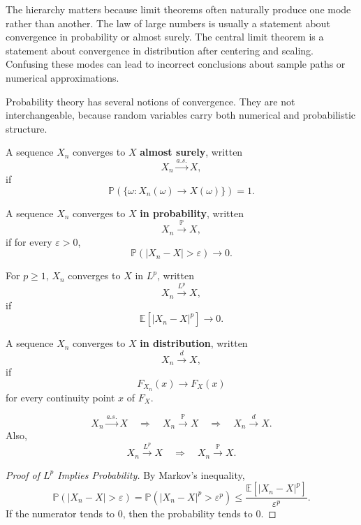 The hierarchy matters because limit theorems often naturally produce one mode rather than another. The law of large numbers is usually a statement about convergence in probability or almost surely. The central limit theorem is a statement about convergence in distribution after centering and scaling. Confusing these modes can lead to incorrect conclusions about sample paths or numerical approximations.

Probability theory has several notions of convergence. They are not interchangeable, because random variables carry both numerical and probabilistic structure.

\begin{definition}
A sequence $X_n$ converges to $X$ \textbf{almost surely}, written
\[
    X_n\xrightarrow{a.s.}X,
\]
if
\[
    \mathbb{P}\left(\{\omega:X_n(\omega)\to X(\omega)\}\right)=1.
\]
\end{definition}

\begin{definition}
A sequence $X_n$ converges to $X$ \textbf{in probability}, written
\[
    X_n\xrightarrow{\mathbb{P}}X,
\]
if for every $\varepsilon>0$,
\[
    \mathbb{P}(|X_n-X|>\varepsilon)\to 0.
\]
\end{definition}

\begin{definition}[$L^p$ Convergence]
For $p\geq 1$, $X_n$ converges to $X$ in $L^p$, written
\[
    X_n\xrightarrow{L^p}X,
\]
if
\[
    \mathbb{E}[|X_n-X|^p]\to 0.
\]
\end{definition}

\begin{definition}
A sequence $X_n$ converges to $X$ \textbf{in distribution}, written
\[
    X_n\xrightarrow{d}X,
\]
if
\[
    F_{X_n}(x)\to F_X(x)
\]
for every continuity point $x$ of $F_X$.
\end{definition}


\begin{theorem}
\[
    X_n\xrightarrow{a.s.}X\quad\Longrightarrow\quad X_n\xrightarrow{\mathbb{P}}X\quad\Longrightarrow\quad X_n\xrightarrow{d}X.
\]
Also,
\[
    X_n\xrightarrow{L^p}X\quad\Longrightarrow\quad X_n\xrightarrow{\mathbb{P}}X.
\]
\end{theorem}

\begin{proof}[Proof of $L^p$ Implies Probability]
By Markov's inequality,
\[
    \mathbb{P}(|X_n-X|>\varepsilon)
    =\mathbb{P}(|X_n-X|^p>\varepsilon^p)
    \leq\frac{\mathbb{E}[|X_n-X|^p]}{\varepsilon^p}.
\]
If the numerator tends to $0$, then the probability tends to $0$.
\end{proof}

